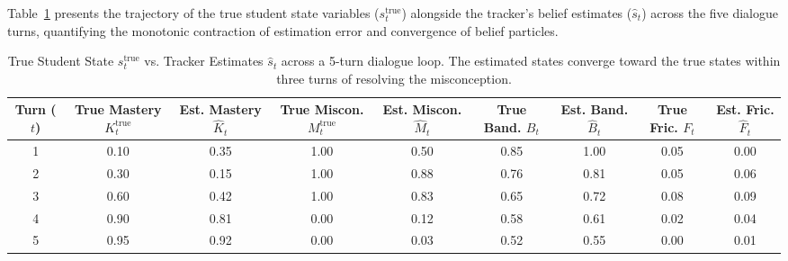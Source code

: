 \documentclass[11pt,a4paper]{report}
\begin{document}
Table~\ref{tab:state_trace} presents the trajectory of the true student state variables ($s_t^{\text{true}}$) alongside the tracker's belief estimates ($\hat{s}_t$) across the five dialogue turns, quantifying the monotonic contraction of estimation error and convergence of belief particles.

\begin{table}[htbp]
\centering
\small
\begin{tabular}{c|cc|cc|cc|cc}
\toprule
\textbf{Turn ($t$)} & \shortstack{\textbf{True}\\\textbf{Mastery}\\$K_t^{\text{true}}$} & \shortstack{\textbf{Est.}\\\textbf{Mastery}\\\phantom{i}$\hat{K}_t$\phantom{i}} & \shortstack{\textbf{True}\\\textbf{Miscon.}\\$M_t^{\text{true}}$} & \shortstack{\textbf{Est.}\\\textbf{Miscon.}\\\phantom{i}$\hat{M}_t$\phantom{i}} & \shortstack{\textbf{True}\\\textbf{Band.}\\$B_t$} & \shortstack{\textbf{Est.}\\\textbf{Band.}\\\phantom{i}$\hat{B}_t$\phantom{i}} & \shortstack{\textbf{True}\\\textbf{Fric.}\\$F_t$} & \shortstack{\textbf{Est.}\\\textbf{Fric.}\\\phantom{i}$\hat{F}_t$\phantom{i}} \\
\midrule
1 & 0.10 & 0.35 & 1.00 & 0.50 & 0.85 & 1.00 & 0.05 & 0.00 \\
2 & 0.30 & 0.15 & 1.00 & 0.88 & 0.76 & 0.81 & 0.05 & 0.06 \\
3 & 0.60 & 0.42 & 1.00 & 0.83 & 0.65 & 0.72 & 0.08 & 0.09 \\
4 & 0.90 & 0.81 & 0.00 & 0.12 & 0.58 & 0.61 & 0.02 & 0.04 \\
5 & 0.95 & 0.92 & 0.00 & 0.03 & 0.52 & 0.55 & 0.00 & 0.01 \\
\bottomrule
\end{tabular}
\caption{True Student State $s_t^{\text{true}}$ vs. Tracker Estimates $\hat{s}_t$ across a 5-turn dialogue loop. The estimated states converge toward the true states within three turns of resolving the misconception.}
\label{tab:state_trace}
\end{table}
\end{document}
